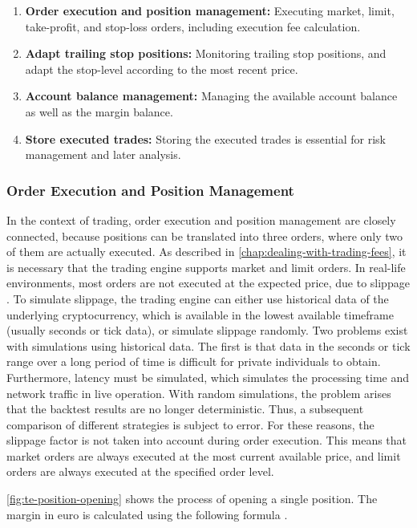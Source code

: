\begin{enumerate}
    \item \textbf{Order execution and position management:} Executing market, limit, take-profit, and stop-loss orders, including execution fee calculation.
    \item \textbf{Adapt trailing stop positions:} Monitoring trailing stop positions, and adapt the stop-level according to the most recent price.
    \item \textbf{Account balance management:} Managing the available account balance as well as the margin balance.
    \item \textbf{Store executed trades:} Storing the executed trades is essential for risk management and later analysis.
\end{enumerate}

\subsubsection{Order Execution and Position Management}

In the context of trading, order execution and position management are closely connected, because positions can be translated into three orders, where only two of them are actually executed.
As described in \autoref{chap:dealing-with-trading-fees}, it is necessary that the trading engine supports market and limit orders.
In real-life environments, most orders are not executed at the expected price, due to slippage \cite{ig-slippage}.
To simulate slippage, the trading engine can either use historical data of the underlying cryptocurrency, which is available in the lowest available timeframe (usually seconds or tick data), or simulate slippage randomly.
Two problems exist with simulations using historical data.
The first is that data in the seconds or tick range over a long period of time is difficult for private individuals to obtain.
Furthermore, latency must be simulated, which simulates the processing time and network traffic in live operation.
With random simulations, the problem arises that the backtest results are no longer deterministic.
Thus, a subsequent comparison of different strategies is subject to error.
For these reasons, the slippage factor is not taken into account during order execution.
This means that market orders are always executed at the most current available price, and limit orders are always executed at the specified order level.


\autoref{fig:te-position-opening} shows the process of opening a single position.
The margin in euro is calculated using the following formula \cite{margin-calculation}.


